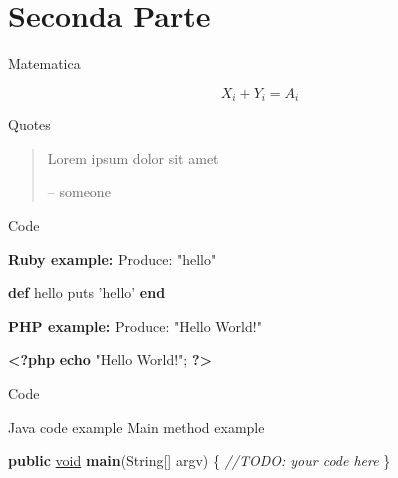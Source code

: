 \documentclass[italian,ignorenonframetext,]{beamer}
\newenvironment{Shaded}{\begin{snugshade}}{\end{snugshade}}
\newcommand{\KeywordTok}[1]{\textcolor[rgb]{0.26,0.66,0.93}{\textbf{{#1}}}}
\newcommand{\DataTypeTok}[1]{\textcolor[rgb]{0.74,0.68,0.62}{\underline{{#1}}}}
\newcommand{\StringTok}[1]{\textcolor[rgb]{0.02,0.61,0.04}{{#1}}}
\newcommand{\CommentTok}[1]{\textcolor[rgb]{0.00,0.40,1.00}{\textit{{#1}}}}
\newcommand{\OtherTok}[1]{\textcolor[rgb]{0.74,0.68,0.62}{{#1}}}
\newcommand{\FunctionTok}[1]{\textcolor[rgb]{1.00,0.58,0.35}{\textbf{{#1}}}}
\newcommand{\NormalTok}[1]{\textcolor[rgb]{0.74,0.68,0.62}{{#1}}}
\begin{document}
\section{Seconda Parte}\label{seconda-parte}

\begin{frame}{Matematica}

\[X_i + Y_i = A_i\]

\end{frame}

\begin{frame}{Quotes}

\begin{quote}
Lorem ipsum dolor sit amet

-- someone
\end{quote}

\end{frame}

\begin{frame}[fragile]{Code}


\begin{exampleblock}{\textbf{Ruby example:}}
Produce: "hello"
\end{exampleblock}

\begin{Shaded}
\begin{Highlighting}[]
\KeywordTok{def} \NormalTok{hello}
  \NormalTok{puts }\StringTok{'hello'}
\KeywordTok{end}
\end{Highlighting}
\end{Shaded}

\begin{exampleblock}{\textbf{PHP example:}}
  Produce: "Hello World!"
\end{exampleblock}

\begin{Shaded}
\begin{Highlighting}[]
\KeywordTok{<?php}
  \FunctionTok{echo} \StringTok{"Hello World!"}\OtherTok{;}
\KeywordTok{?>}
\end{Highlighting}
\end{Shaded}

\end{frame}

\begin{frame}[fragile]{Code}

\begin{exampleblock}{Java code example}
  Main method example
\end{exampleblock}

\begin{Shaded}
\begin{Highlighting}[]
\KeywordTok{public} \DataTypeTok{void} \FunctionTok{main}\NormalTok{(String[] argv) \{}
    \CommentTok{//TODO: your code here}
\NormalTok{\}}
\end{Highlighting}
\end{Shaded}

\end{frame}
\end{document}
